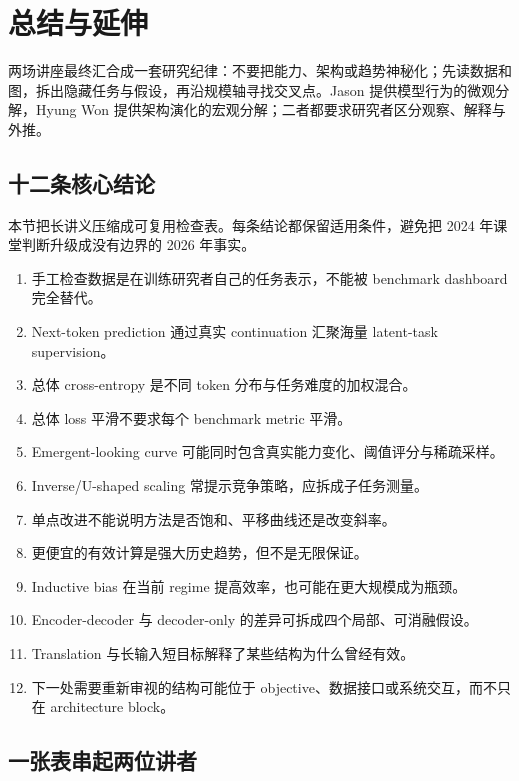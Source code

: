 \section{总结与延伸}

两场讲座最终汇合成一套研究纪律：不要把能力、架构或趋势神秘化；先读数据和图，拆出隐藏任务与假设，再沿规模轴寻找交叉点。Jason 提供模型行为的微观分解，Hyung Won 提供架构演化的宏观分解；二者都要求研究者区分观察、解释与外推。

\subsection{十二条核心结论}

本节把长讲义压缩成可复用检查表。每条结论都保留适用条件，避免把 2024 年课堂判断升级成没有边界的 2026 年事实。

\begin{enumerate}
  \item 手工检查数据是在训练研究者自己的任务表示，不能被 benchmark dashboard 完全替代。
  \item Next-token prediction 通过真实 continuation 汇聚海量 latent-task supervision。
  \item 总体 cross-entropy 是不同 token 分布与任务难度的加权混合。
  \item 总体 loss 平滑不要求每个 benchmark metric 平滑。
  \item Emergent-looking curve 可能同时包含真实能力变化、阈值评分与稀疏采样。
  \item Inverse/U-shaped scaling 常提示竞争策略，应拆成子任务测量。
  \item 单点改进不能说明方法是否饱和、平移曲线还是改变斜率。
  \item 更便宜的有效计算是强大历史趋势，但不是无限保证。
  \item Inductive bias 在当前 regime 提高效率，也可能在更大规模成为瓶颈。
  \item Encoder-decoder 与 decoder-only 的差异可拆成四个局部、可消融假设。
  \item Translation 与长输入短目标解释了某些结构为什么曾经有效。
  \item 下一处需要重新审视的结构可能位于 objective、数据接口或系统交互，而不只在 architecture block。
\end{enumerate}

\subsection{一张表串起两位讲者}

